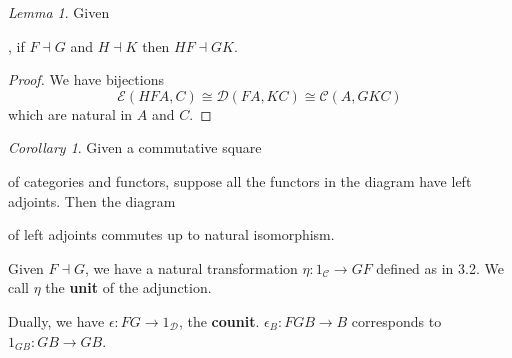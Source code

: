 \documentclass[a4paper]{article}
\theoremstyle{definition}
\theoremstyle{remark}
\theoremstyle{default}
\newtheorem{lemma}[definition]{Lemma}
\newtheorem{corollary}[definition]{Corollary}
\numberwithin{definition}{section}
\begin{document}
\begin{lemma}
	Given
	,
	if $F \dashv G$ and $H \dashv K$ then $HF \dashv GK$.
\end{lemma}
\begin{proof}
	We have bijections
	$$\mathcal{E}(HFA, C) \cong \mathcal{D}(FA, KC) \cong \mathcal{C}(A, GKC)$$
	which are natural in $A$ and $C$.
\end{proof}

\begin{corollary}
	Given a commutative square
	of categories and functors,
	suppose all the functors in the diagram have left adjoints.
	Then the diagram
	of left adjoints commutes up to natural isomorphism.
\end{corollary}

Given $F \dashv G$,
we have a natural transformation $\eta: 1_\mathcal{C} \to GF$
defined as in 3.2. We call $\eta$ the \textbf{unit} of the adjunction.

Dually, we have $\epsilon: FG \to 1_\mathcal{D}$, the \textbf{counit}.
$\epsilon_B: FGB \to B$ corresponds to $1_{GB}: GB \to GB$.
\end{document}
